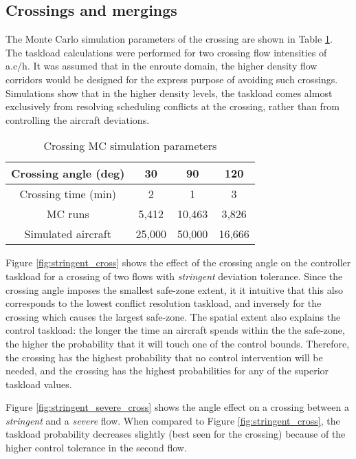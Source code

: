 \documentclass[conference]{IEEEtran}
\begin{document}
\subsection{Crossings and mergings}
The Monte Carlo simulation parameters of the crossing are shown in Table \ref{tab:cross_MC}. The taskload calculations were performed for two crossing flow intensities of  a.c/h. It was assumed that in the enroute domain, the higher density flow corridors would be designed for the express purpose of avoiding such crossings. Simulations show that in the higher density levels, the taskload comes almost exclusively from resolving scheduling conflicts at the crossing, rather than from controlling the aircraft deviations.

\begin{table}
\caption{Crossing MC simulation parameters}
\label{tab:cross_MC}
\centering
\begin{tabular}{|c|c|c|c|}
\hline\hline
Crossing angle  (deg)&  30 & 90 & 120 \bigstrut\\ \hline
Crossing time (min) & 2 & 1 & 3 \bigstrut \\ \hline
MC runs& 5,412 &10,463 & 3,826\bigstrut \\ \hline
Simulated aircraft & 25,000 & 50,000 & 16,666 \bigstrut\\ \hline\hline
\end{tabular}
\end{table}


Figure \ref{fig:stringent_cross} shows the effect of the crossing angle  on the controller taskload for a crossing of two flows with \emph{stringent} deviation tolerance. Since the  crossing angle imposes the smallest safe-zone extent, it it intuitive that this also corresponds to the lowest conflict resolution taskload, and inversely for the  crossing which causes the largest safe-zone. The spatial extent also explains the control taskload: the longer the time an aircraft spends within the the safe-zone, the higher the probability that it will touch one of the control bounds. Therefore, the  crossing has the highest probability that no control intervention will be needed, and the  crossing has the highest probabilities for any of the superior taskload values.

Figure \ref{fig:stringent_severe_cross} shows the angle effect on a crossing between a \emph{stringent} and a \emph{severe} flow. When compared to Figure \ref{fig:stringent_cross}, the taskload probability decreases slightly (best seen for the  crossing)  because of the higher control tolerance in the second flow.
\end{document}
